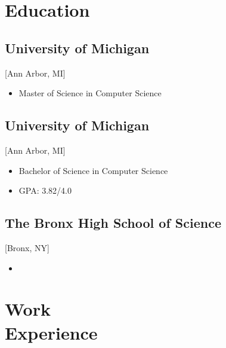 \documentclass{mycv}
\begin{document}
\maketitle%

\section{Education}

\subsection{University of Michigan}[Ann Arbor, MI]
\vspace{-\parskip}%
\begin{itemize}[label={}]
  \item Master of Science in Computer Science 
\end{itemize}

\subsection{University of Michigan}[Ann Arbor, MI]
\vspace{-\parskip}%
\begin{itemize}[label={}]
  \item Bachelor of Science in Computer Science 
  \item GPA: 3.82/4.0
\end{itemize}

\subsection{The Bronx High School of Science}[Bronx, NY]
\vspace{-\parskip}%
\begin{itemize}[label={}]
  \item {}
\end{itemize}

\section{Work\\Experience}
\end{document}
